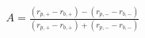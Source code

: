 


\begin{eqnarray*}
  A = \frac{(r_{p,+} - r_{b,+}) - (r_{p,-} - r_{b,-})}{(r_{p,+} - r_{b,+}) + (r_{p,-} - r_{b,-})}
\end{eqnarray*}

